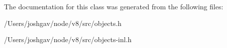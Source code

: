 The documentation for this class was generated from the following files\+:\begin{DoxyCompactItemize}
\item 
/\+Users/joshgav/node/v8/src/objects.\+h\item 
/\+Users/joshgav/node/v8/src/objects-\/inl.\+h\end{DoxyCompactItemize}
